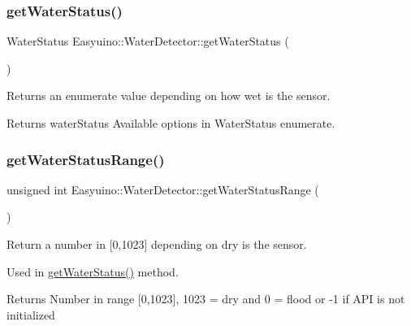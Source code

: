 \subsubsection{\texorpdfstring{get\+Water\+Status()}{getWaterStatus()}}
{\footnotesize\ttfamily Water\+Status Easyuino\+::\+Water\+Detector\+::get\+Water\+Status (\begin{DoxyParamCaption}{ }\end{DoxyParamCaption})}



Returns an enumerate value depending on how wet is the sensor. 

\begin{DoxyReturn}{Returns}
water\+Status Available options in Water\+Status enumerate. 
\end{DoxyReturn}
\mbox{\label{class_easyuino_1_1_water_detector_a4a4c4a0ab6ae8a51535762f38b4f0d01}} 
\subsubsection{\texorpdfstring{get\+Water\+Status\+Range()}{getWaterStatusRange()}}
{\footnotesize\ttfamily unsigned int Easyuino\+::\+Water\+Detector\+::get\+Water\+Status\+Range (\begin{DoxyParamCaption}{ }\end{DoxyParamCaption})}



Return a number in \mbox{[}0,1023\mbox{]} depending on dry is the sensor. 

Used in \hyperlink{class_easyuino_1_1_water_detector_a0dfefd3b3aa2ed21f30ceb8041a8652a}{get\+Water\+Status()} method. \begin{DoxyReturn}{Returns}
Number in range \mbox{[}0,1023\mbox{]}, 1023 = dry and 0 = flood or -\/1 if A\+PI is not initialized 
\end{DoxyReturn}
\mbox{\label{class_easyuino_1_1_water_detector_a9ea69c2eec25543fad47759379d62ce6}} 
